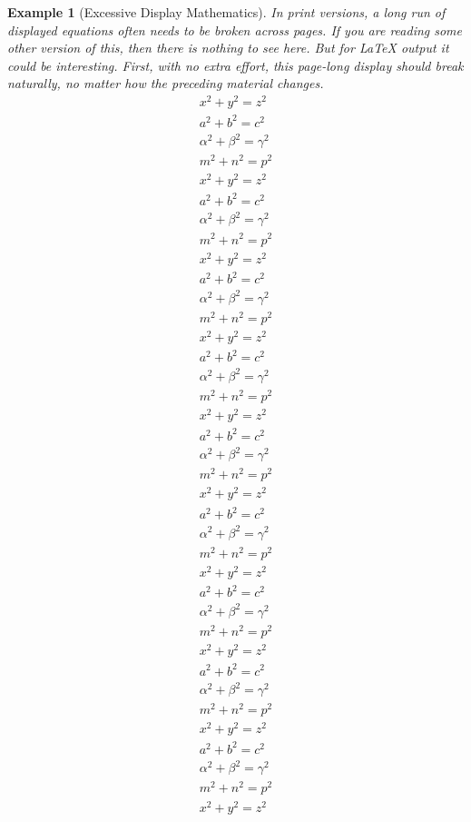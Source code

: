 \documentclass[pdflatex]{sn-jnl}
\theoremstyle{thmstyleone}%
\theoremstyle{thmstyletwo}%
\newtheorem{example}[theorem]{Example}
\theoremstyle{thmstylethree}%
\numberwithin{equation}{section}
\begin{document}
\begin{example}[Excessive Display Mathematics]\label{section-mathematics-4-10}%
%
In print versions, a long run of displayed equations often needs to be broken across pages.  If you are reading some other version of this, then there is nothing to see here.  But for \LaTeX{} output it could be interesting.  First, with no extra effort, this page-long display should break naturally, no matter how the preceding material changes.%
\begin{gather*}
x^2+y^2=z^2\\
a^2+b^2=c^2\\
\alpha^2+\beta^2=\gamma^2\\
m^2+n^2=p^2\\
x^2+y^2=z^2\\
a^2+b^2=c^2\\
\alpha^2+\beta^2=\gamma^2\\
m^2+n^2=p^2\\
x^2+y^2=z^2\\
a^2+b^2=c^2\\
\alpha^2+\beta^2=\gamma^2\\
m^2+n^2=p^2\\
x^2+y^2=z^2\\
a^2+b^2=c^2\\
\alpha^2+\beta^2=\gamma^2\\
m^2+n^2=p^2\\
x^2+y^2=z^2\\
a^2+b^2=c^2\\
\alpha^2+\beta^2=\gamma^2\\
m^2+n^2=p^2\\
x^2+y^2=z^2\\
a^2+b^2=c^2\\
\alpha^2+\beta^2=\gamma^2\\
m^2+n^2=p^2\\
x^2+y^2=z^2\\
a^2+b^2=c^2\\
\alpha^2+\beta^2=\gamma^2\\
m^2+n^2=p^2\\
x^2+y^2=z^2\\
a^2+b^2=c^2\\
\alpha^2+\beta^2=\gamma^2\\
m^2+n^2=p^2\\
x^2+y^2=z^2\\
a^2+b^2=c^2\\
\alpha^2+\beta^2=\gamma^2\\
m^2+n^2=p^2\\
x^2+y^2=z^2\\

\end{gather*}
\end{example}
\end{document}
